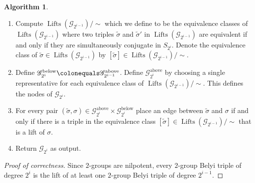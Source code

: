 \documentclass{dcthesis}
\newcommand{\wt}[1]{\widetilde{#1}}
\DeclareMathOperator{\Lifts}{Lifts}
\numberwithin{equation}{section}
\theoremstyle{definition}
\newtheorem{alg}[equation]{Algorithm}
\theoremstyle{remark}
\begin{document}
{{\begin{alg}
\begin{enumerate}
\begin{equation}
            \Lifts(\mathscr{G}_{2^{i-1}})
            \colonequals\bigcup_{\sigma\in\mathscr{G}_{2^{i-1}}^\text{above}}\Lifts(\sigma)
          \end{equation}
        \item
          \label{alg:alltriplesiterationmodout}
          Compute
          $\Lifts(\mathscr{G}_{2^{i-1}})/\!\!\sim$
          which we define to be the equivalence
          classes of
          $\Lifts(\mathscr{G}_{2^{i-1}})$
          where two triples
          $\wt{\sigma}$ and $\wt{\sigma}'$
          in
          $\Lifts(\mathscr{G}_{2^{i-1}})$
          are equivalent
          if and only if
          they are simultaneously
          conjugate in $S_{2^{i}}$.
          Denote the equivalence class
          of $\wt{\sigma}\in
          \Lifts(\mathscr{G}_{2^{i-1}})$
          by $[\wt{\sigma}]\in
          \Lifts(\mathscr{G}_{2^{i-1}})/\!\!\sim$.
        \item
          \label{alg:alltriplesiterationnodes}
          Define
          $\mathscr{G}_{2^i}^\text{below}
          \colonequals\mathscr{G}_{2^{i-1}}^\text{above}$.
          Define
          $\mathscr{G}_{2^i}^\text{above}$
          by choosing a single representative
          for each equivalence class of
          $\Lifts(\mathscr{G}_{2^{i-1}})/\!\!\sim$.
          This defines
          the nodes of
          $\mathscr{G}_{2^i}$.
        \item
          \label{alg:alltriplesiterationedges}
          For every pair
          $(\wt{\sigma},\sigma)\in
          \mathscr{G}_{2^i}^\text{above}
          \times
          \mathscr{G}_{2^i}^\text{below}$
          place an edge between
          $\wt{\sigma}$ and $\sigma$
          if and only if
          there is a triple in the equivalence
          class $[\wt{\sigma}]\in
          \Lifts(\mathscr{G}_{2^{i-1}})/\!\!\sim$
          that is a lift of $\sigma$.
        \item
          \label{alg:alltriplesiterationreturn}
          Return
          $\mathscr{G}_{2^i}$
          as output.
      \end{enumerate}
    \end{alg}
    \begin{proof}[Proof of correctness]
      Since $2$-groups are nilpotent,
      every
      $2$-group Belyi triple
      of degree $2^i$
      is the lift of at least one
      $2$-group Belyi triple
      of degree $2^{i-1}$.

\end{proof}}}
\end{document}
